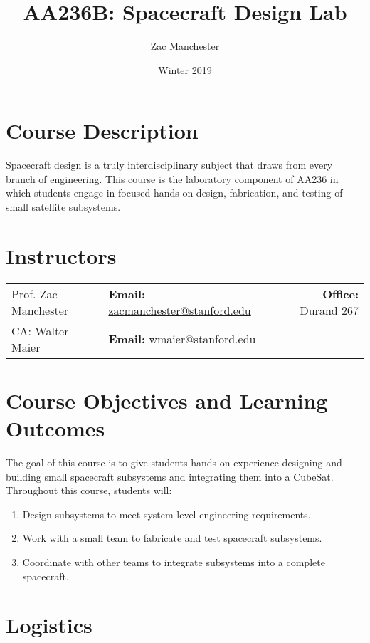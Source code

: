\documentclass[11pt,letterpaper]{article}
\title{AA236B: Spacecraft Design Lab}
\author{Zac Manchester}
\date{Winter 2019}
\begin{document}
\maketitle

\section*{Course Description}

Spacecraft design is a truly interdisciplinary subject that draws from every branch of engineering. This course is the laboratory component of AA236 in which students engage in focused hands-on design, fabrication, and testing of small satellite subsystems.

\section*{Instructors}

\begin{center}
\begin{tabular}{l l r}
	Prof. Zac Manchester & \textbf{Email:} \href{mailto:zacmanchester@stanford.edu}{zacmanchester@stanford.edu} & \textbf{Office:} Durand 267 \\
	CA: Walter Maier & \textbf{Email:} wmaier@stanford.edu
\end{tabular}
\end{center}

\section*{Course Objectives and Learning Outcomes}

The goal of this course is to give students hands-on experience designing and building small spacecraft subsystems and integrating them into a CubeSat. Throughout this course, students will:
\begin{enumerate}
	\item Design subsystems to meet system-level engineering requirements.
	\item Work with a small team to fabricate and test spacecraft subsystems.
	\item Coordinate with other teams to integrate subsystems into a complete spacecraft.
\end{enumerate}


\section*{Logistics}
\end{document}
